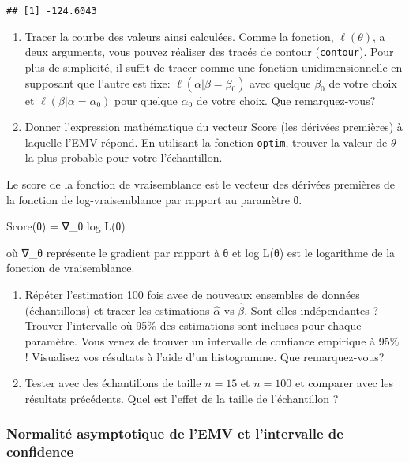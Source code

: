 \documentclass[
]{article}
\begin{document}
\begin{verbatim}
## [1] -124.6043
\end{verbatim}

\begin{enumerate}
\def\labelenumi{\arabic{enumi}.}
\setcounter{enumi}{8}
\item
  Tracer la courbe des valeurs ainsi calculées. Comme la fonction,
  \(\ell(\theta)\), a deux arguments, vous pouvez réaliser des tracés de
  contour (\texttt{contour}). Pour plus de simplicité, il suffit de
  tracer comme une fonction unidimensionnelle en supposant que l'autre
  est fixe: \(\ell(\alpha|\beta=\beta_0)\) avec quelque \(\beta_0\) de
  votre choix et \(\ell(\beta| \alpha=\alpha_0)\) pour quelque
  \(\alpha_0\) de votre choix. Que remarquez-vous?
\item
  Donner l'expression mathématique du vecteur Score (les dérivées
  premières) à laquelle l'EMV répond. En utilisant la fonction
  \texttt{optim}, trouver la valeur de \(\theta\) la plus probable pour
  votre l'échantillon.
\end{enumerate}

Le score de la fonction de vraisemblance est le vecteur des dérivées
premières de la fonction de log-vraisemblance par rapport au paramètre
θ.

Score(θ) = ∇\_θ log L(θ)

où ∇\_θ représente le gradient par rapport à θ et log L(θ) est le
logarithme de la fonction de vraisemblance.

\begin{enumerate}
\def\labelenumi{\arabic{enumi}.}
\setcounter{enumi}{10}
\item
  Répéter l'estimation 100 fois avec de nouveaux ensembles de données
  (échantillons) et tracer les estimations \(\hat\alpha\) vs
  \(\hat\beta\). Sont-elles indépendantes ? Trouver l'intervalle où 95\%
  des estimations sont incluses pour chaque paramètre. Vous venez de
  trouver un intervalle de confiance empirique à 95\% ! Visualisez vos
  résultats à l'aide d'un histogramme. Que remarquez-vous?
\item
  Tester avec des échantillons de taille \(n=15\) et \(n=100\) et
  comparer avec les résultats précédents. Quel est l'effet de la taille
  de l'échantillon ?
\end{enumerate}

\hypertarget{normalituxe9-asymptotique-de-lemv-et-lintervalle-de-confidence}{%
\subsubsection{Normalité asymptotique de l'EMV et l'intervalle de
confidence}\label{normalituxe9-asymptotique-de-lemv-et-lintervalle-de-confidence}}
\end{document}
